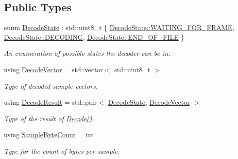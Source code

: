 \subsection*{Public Types}
\begin{DoxyCompactItemize}
\item 
enum \hyperlink{classAudioSource_a9a2f5de44325c84e69a7af1331aa159d}{Decode\+State} \+: std\+::uint8\+\_\+t \{ \hyperlink{classAudioSource_a9a2f5de44325c84e69a7af1331aa159da22a62bc6e9b3fff5866c4259f046bad8}{Decode\+State\+::\+W\+A\+I\+T\+I\+N\+G\+\_\+\+F\+O\+R\+\_\+\+F\+R\+A\+M\+E}, 
\hyperlink{classAudioSource_a9a2f5de44325c84e69a7af1331aa159da9b75f3acd3c3480965b0f5ee466e7f25}{Decode\+State\+::\+D\+E\+C\+O\+D\+I\+N\+G}, 
\hyperlink{classAudioSource_a9a2f5de44325c84e69a7af1331aa159da581953f6b20ad7f993b64b1dc632032e}{Decode\+State\+::\+E\+N\+D\+\_\+\+O\+F\+\_\+\+F\+I\+L\+E}
 \}
\begin{DoxyCompactList}\small\item\em An enumeration of possible states the decoder can be in. \end{DoxyCompactList}\item 
\hypertarget{classAudioSource_a836c61e348dbe7df6ba255669c015303}{using \hyperlink{classAudioSource_a836c61e348dbe7df6ba255669c015303}{Decode\+Vector} = std\+::vector$<$ std\+::uint8\+\_\+t $>$}\label{classAudioSource_a836c61e348dbe7df6ba255669c015303}

\begin{DoxyCompactList}\small\item\em Type of decoded sample vectors. \end{DoxyCompactList}\item 
\hypertarget{classAudioSource_aadbadeba50d982d09cfe0d1e05160ef9}{using \hyperlink{classAudioSource_aadbadeba50d982d09cfe0d1e05160ef9}{Decode\+Result} = std\+::pair$<$ \hyperlink{classAudioSource_a9a2f5de44325c84e69a7af1331aa159d}{Decode\+State}, \hyperlink{classAudioSource_a836c61e348dbe7df6ba255669c015303}{Decode\+Vector} $>$}\label{classAudioSource_aadbadeba50d982d09cfe0d1e05160ef9}

\begin{DoxyCompactList}\small\item\em Type of the result of \hyperlink{classAudioSource_a6b5071168332523b68593bc47170f36f}{Decode()}. \end{DoxyCompactList}\item 
\hypertarget{classAudioSource_a1c8138ec9ffb9fd1394d0ad0782d60fa}{using \hyperlink{classAudioSource_a1c8138ec9ffb9fd1394d0ad0782d60fa}{Sample\+Byte\+Count} = int}\label{classAudioSource_a1c8138ec9ffb9fd1394d0ad0782d60fa}

\begin{DoxyCompactList}\small\item\em Type for the count of bytes per sample. \end{DoxyCompactList}\end{DoxyCompactItemize}
